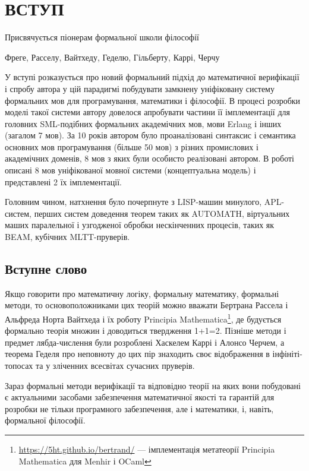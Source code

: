 \chapter*{ВСТУП}
\epigraph{Присвячується піонерам формальної школи філософії}
         {Фреге, Расселу, Вайтхеду, Геделю, Гільберту, Каррі, Черчу}

У вступі розказується про новий формальний підхід до математичної верифікації і спробу автора
у цій парадигмі побудувати замкнену уніфіковану систему формальних мов для
програмування, математики і філософії. В процесі розробки моделі такої системи автору
довелося апробувати частини її імплементації для головних SML-подібних формальних академічних мов,
мови Erlang і інших (загалом 7 мов). За 10 років автором було проаналізовані
синтаксис і семантика основних мов програмування (більше 50 мов) з різних промислових
і академічних доменів, 8 мов з яких були особисто реалізовані автором. В роботі
описані 8 мов уніфікованої мовної системи (концептуальна модель) і представлені 2 їх імплементації.

Головним чином, натхнення було почерпнуте з LISP-машин минулого, APL-систем,
перших систем доведення теорем таких як AUTOMATH, віртуальних маших паралельної
і узгодженої обробки нескінченних процесів, таких як BEAM, кубічних MLTT-пруверів.

\section*{Вступне слово}
Якщо говорити про математичну логіку, формальну математику, формальні методи,
то основоположниками цих теорій можно вважати Бертрана Рассела і Альфреда Норта Вайтхеда і їх роботу
Principia Mathematica\footnote{\url{https://5ht.github.io/bertrand/} --- імплементація
метатеорії Principia Mathematica для Menhir і OCaml},
де будується формально теорія множин і доводиться твердження 1+1=2. Пізніше методи і предмет
лябда-числення були розроблені Хаскелем Каррі і Алонсо Черчем, а теорема Геделя про неповноту до цих пір
знаходить своє відображення в інфініті-топосах та у зліченних всесвітах сучасних пруверів.

Зараз формальні методи верифікації та відповідно теорії на яких вони побудовані
є актуальними засобами забезпечення математичної якості та гарантій для розробки не тільки
програмного забезпечення, але і математики, і, навіть, формальної філософії.

